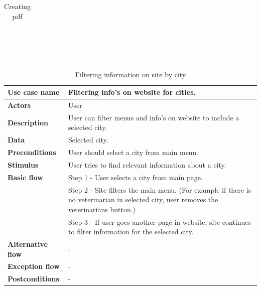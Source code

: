 \begin{center}
\begin{table}[H]
\begin{tabular}{| m{3cm}| m{10cm} |}
            \hline
        \end{tabular}
        \caption[Creating pdf]{Creating pdf}
    \end{table}
    ~\\~\\~\\
    \begin{table}[H]
        \begin{tabular}{| m{3cm}| m{10cm} |}
            \hline
            \textbf{Use case name} & Filtering info's on website for cities.  \\
            \hline
            \textbf{Actors} & User\\
            \hline
            \textbf{Description} & User can filter menus and info's on website to include a selected city.\\
            \hline
            \textbf{Data} & Selected city.\\
            \hline
            \textbf{Preconditions} &  User should select a city from main menu.\\
            \hline
            \textbf{Stimulus} & User tries to find relevant information about a city. \\
            \hline
            \textbf{Basic flow} & Step 1 - User selects a city from main page. \\
                                & Step 2 - Site filters the main menu. (For example if there is no veterinarian in selected city, user removes the veterinarians button.)\\
                                & Step 3 - If user goes another page in website, site continues to filter information for the selected city.\\
            \hline
            \textbf{Alternative flow} & - \\
            \hline
            \textbf{Exception flow} &  -\\
            \hline
            \textbf{Postconditions} & -\\
            \hline
        \end{tabular}
        \caption[Filtering information on site by city]{Filtering information on site by city}
    \end{table}
    ~\\~\\~\\
    \begin{table}[H]
        \begin{tabular}{| m{3cm}| m{10cm} |}

\end{tabular}
\end{table}
\end{center}
